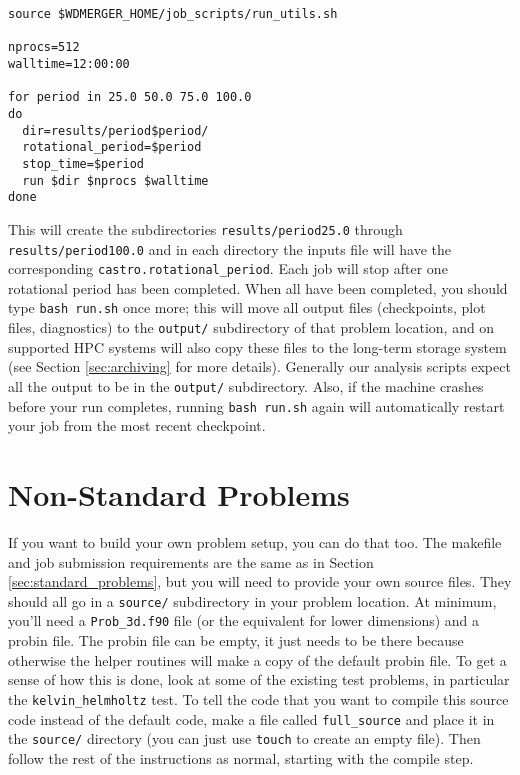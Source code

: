 \documentclass[12pt]{book}
\begin{document}
\begin{lstlisting}
source $WDMERGER_HOME/job_scripts/run_utils.sh

nprocs=512
walltime=12:00:00

for period in 25.0 50.0 75.0 100.0
do
  dir=results/period$period/
  rotational_period=$period
  stop_time=$period
  run $dir $nprocs $walltime
done
\end{lstlisting}%
This will create the subdirectories \texttt{results/period25.0} through \texttt{results/period100.0}
and in each directory the inputs file will have the corresponding \texttt{castro.rotational\_period}.
Each job will stop after one rotational period has been completed. When all have been completed, you should 
type \texttt{bash run.sh} once more; this will move all output files (checkpoints, plot files, diagnostics)
to the \texttt{output/} subdirectory of that problem location, and on supported HPC systems will also copy these 
files to the long-term storage system (see Section \ref{sec:archiving} for more details). 
Generally our analysis scripts expect all the output to be in the 
\texttt{output/} subdirectory. Also, if the machine crashes before your run completes, running \texttt{bash run.sh}
again will automatically restart your job from the most recent checkpoint.

\section{Non-Standard Problems}
\label{sec:non-standard_problems}

If you want to build your own problem setup, you can do that too. The makefile and job submission 
requirements are the same as in Section \ref{sec:standard_problems}, but you will need to provide 
your own source files. They should all go in a \texttt{source/} subdirectory in your problem location.
At minimum, you'll need a \texttt{Prob\_3d.f90} file (or the equivalent for lower dimensions) and a 
probin file. The probin file can be empty, it just needs to be there because otherwise the helper 
routines will make a copy of the default probin file. To get a sense of how this is done, look at 
some of the existing test problems, in particular the \texttt{kelvin\_helmholtz} test. To tell the 
code that you want to compile this source code instead of the default code, make a file called 
\texttt{full\_source} and place it in the \texttt{source/} directory (you can just use \texttt{touch}
to create an empty file). Then follow the rest of the instructions as normal, starting with the 
compile step.
\end{document}
